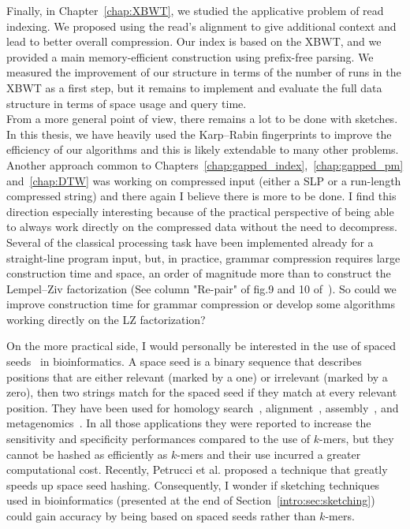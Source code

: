 Finally, in Chapter~\ref{chap:XBWT}, we studied the applicative problem of read indexing. We proposed using the read's alignment to give additional context and lead to better overall compression. Our index is based on the XBWT, and we provided a main memory-efficient construction using prefix-free parsing. We measured the improvement of our structure in terms of the number of runs in the XBWT as a first step, but it remains to implement and evaluate the full data structure in terms of space usage and query time.\\


From a more general point of view, there remains a lot to be done with sketches. In this thesis, we have heavily used the Karp--Rabin fingerprints to improve the efficiency of our algorithms and this is likely extendable to many other problems. Another approach common to Chapters~\ref*{chap:gapped_index},~\ref*{chap:gapped_pm} and~\ref*{chap:DTW} was working on compressed input (either a SLP or a run-length compressed string) and there again I believe there is more to be done. I find this direction especially interesting because of the practical perspective of being able to always work directly on the compressed data without the need to decompress. Several of the classical processing task have been implemented already for a straight-line program input, but, in practice, grammar compression requires large construction time and space, an order of magnitude more than to construct the Lempel--Ziv factorization (See column "Re-pair" of fig.9 and 10 of~\cite{DBLP:journals/jcss/ClaudeNP21}). So could we improve construction time for grammar compression or develop some algorithms working directly on the LZ factorization?


On the more practical side, I would personally be interested in the use of spaced seeds~\cite{li2004patternhunter} in bioinformatics. A space seed is a binary sequence that describes positions that are either relevant (marked by a one) or irrelevant (marked by a zero), then two strings match for the spaced seed if they match at every relevant position.
They have been used for homology search~\cite{ma2002patternhunter}, alignment~\cite{david2011shrimp2}, assembly~\cite{birol2015spaced}, and metagenomics~\cite{bvrinda2015spaced}. In all those applications they were reported to increase the sensitivity and specificity performances compared to the use of $k$-mers, but they cannot be hashed as efficiently as $k$-mers and their use incurred a greater computational cost. Recently, Petrucci et al.\cite{petrucci2020iterative} proposed a technique that greatly speeds up space seed hashing. Consequently, I wonder if sketching techniques used in bioinformatics (presented at the end of Section~\ref{intro:sec:sketching}) could gain accuracy by being based on spaced seeds rather than $k$-mers.

\backmatter